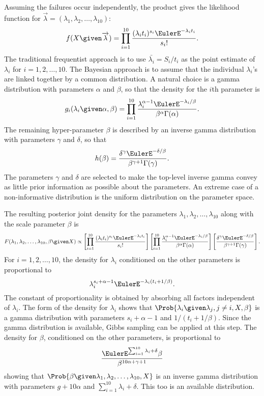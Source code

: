 \documentclass[12pt]{article}
\begin{document}
Assuming the failures occur independently, the product gives the
likelihood function for \( \overrightarrow{\lambda} = (\lambda_1,
\lambda_2, \dots, \lambda_{10}) \):
\[
    f(X \given \overrightarrow{\lambda}) = \prod\limits_{i=1}^{10} \frac
    {(\lambda_i t_i)^{s_i} \EulerE^{-\lambda_i t_i}}{s_i!}.
\] The traditional frequentist approach is to use \( \bar{\lambda_i} = S_i/t_i
\) as the point estimate of \( \lambda_i \) for \( i = 1,2, \dots, 10 \).
The Bayesian approach is to assume that the individual \( \lambda_i \)'s
are linked together by a common distribution.  A natural choice is a
gamma distribution with parameters \( \alpha \) and \( \beta \), so that
the density for the \( i \)th parameter is
\[
    g_i(\lambda_i \given \alpha, \beta) =\prod\limits_{i=1}^{10} \frac{\lambda_i^
    {\alpha-1} \EulerE^{-\lambda_i/\beta}}{\beta^{\alpha} \Gamma(\alpha)}.
\] The remaining hyper-parameter \( \beta \) is described by an inverse
gamma distribution with parameters \( \gamma \) and \( \delta \), so
that
\[
    h(\beta) = \frac{\delta^{\gamma} \EulerE^{-\delta/\beta}}{\beta^{\gamma+1}
    \Gamma(\gamma)}.
\] The parameters \( \gamma \) and \( \delta \) are selected to make the
top-level inverse gamma convey as little prior information as possible
about the parameters.  An extreme case of a non-informative distribution
is the uniform distribution on the parameter space.

The resulting posterior joint density for the parameters \( \lambda_1,
\lambda_2, \dots, \lambda_{10} \) along with the scale parameter \(
\beta \) is
\[
    F(\lambda_1, \lambda_2, \dots, \lambda_{10}, \beta \given X) \propto
    \left[ \prod_{i=1}^{10} \frac{(\lambda_i t_i)^{s_i} \EulerE^{-\lambda_i
    t_i}}{s_i!} \right] \left[ \prod_{i=1}^{10} \frac{\lambda_i^{\alpha-1}
    \EulerE^{-\lambda_i/\beta}}{\beta^{\alpha} \Gamma(\alpha)} \right]
    \left[ \frac{\delta^{\gamma} \EulerE^{-\delta/\beta}}{\beta^{\gamma+1}
    \Gamma(\gamma)} \right].
\] For \( i = 1,2, \dots, 10 \), the density for \( \lambda_i \)
conditioned on the other parameters is proportional to
\[
    \lambda_i^{s_i + \alpha -1} \EulerE^{-\lambda_i (t_i+1/\beta)}.
\] The constant of proportionality is obtained by absorbing all factors
independent of \( \lambda_i \).  The form of the density for \( \lambda_i
\) shows that \( \Prob{\lambda_i \given \lambda_j, j \ne i, X, \beta} \)
is a gamma distribution with parameters \( s_i + \alpha -1 \) and \( 1/(t_i
+ 1/\beta) \).  Since the gamma distribution is available, Gibbs
sampling can be applied at this step.  The density for \( \beta \),
conditioned on the other parameters, is proportional to
\[
    \frac{\EulerE^{\sum_{i=1}^{10}\lambda_i + \delta}\beta}{\beta^{10\alpha+\gamma+1}}
\] showing that \( \Prob{\beta \given \lambda_1, \lambda_2, \dots,
\lambda_{10}, X} \) is an inverse gamma distribution with parameters \(
g + 10 \alpha \) and \( \sum\limits_{i=1}^{10} \lambda_i+\delta \). This
too is an available distribution.
\end{document}
